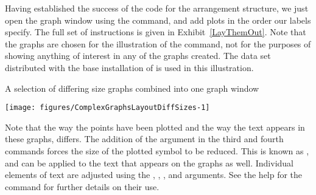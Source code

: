 Having established the success of the code for the arrangement structure, we just open the graph window using the  command, and add plots in the order our labels specify. The full set of instructions is given in Exhibit~\ref{LayThemOut}. Note that the graphs are chosen for the illustration of the  command, not for the purposes of showing anything of interest in any of the graphs created. The  data set distributed with the base installation of \R{} is used in this illustration. 
\begin{exhibit} 
\begin{center} 
\caption{A selection of differing size graphs combined into one graph window} 
\label{LayThemOut} 
\begin{knitrout}
\color{fgcolor}\begin{kframe}
\begin{alltt}
\hlstd{> }
\hlstd{> }
\hlstd{> }
\hlstd{> } \hlstd{=}\hlstd{(}\hlstd{,}\hlstd{))}
\hlstd{> } \hlstd{=}\hlstd{(}\hlstd{,}\hlstd{),} \hlstd{=}\hlstd{)}
\hlstd{> } \hlstd{=}\hlstd{(}\hlstd{,}\hlstd{),} \hlstd{=}\hlstd{)}
\hlstd{> } \hlstd{=}\hlstd{,} \hlstd{=}\hlstd{)}
\hlstd{> }\hlstd{(} \hlstd{=}\hlstd{,} \hlstd{=}\hlstd{)}
\end{alltt}
\end{kframe}
\texttt{[image: figures/ComplexGraphsLayoutDiffSizes-1]} 
\begin{kframe}\begin{alltt}
\hlstd{> }
\end{alltt}
\end{kframe}
\end{knitrout}
\end{center} 
\end{exhibit} 
 
Note that the way the points have been plotted and the way the text appears in these graphs, differs. The addition of the  argument in the third and fourth  commands forces the size of the plotted symbol to be reduced. This is known as , and can be applied to the text that appears on the graphs as well. Individual elements of text are adjusted using the , , , and  arguments. See the help for the  command for further details on their use. 
 
